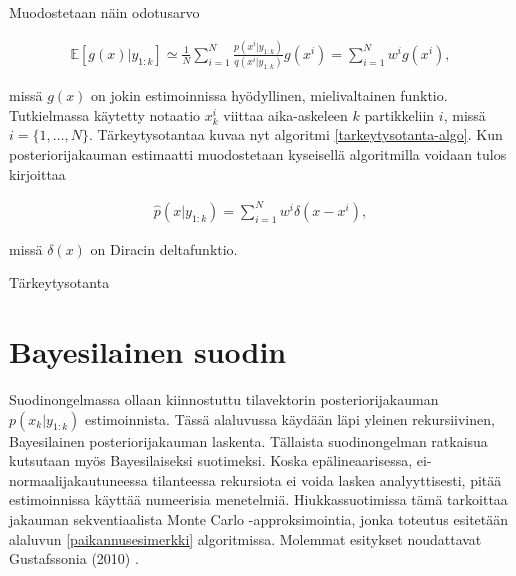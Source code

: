 \documentclass[
  12pt,
  a4paper, twoside]{book}
\begin{document}
Muodostetaan näin odotusarvo

\begin{align}
\mathbb{E}[g(x)|y_{1:k}]\simeq\frac{1}{N}\sum_{i=1}^N\frac{p(x^i|y_{1:k})}{q(x^i|y_{1:k})}g(x^i)=\sum_{i=1}^Nw^ig(x^i),
\end{align}

\noindent missä \(g(x)\) on jokin estimoinnissa hyödyllinen, mielivaltainen funktio. Tutkielmassa käytetty notaatio \(x_k^i\) viittaa aika-askeleen \(k\) partikkeliin \(i\), missä \(i=\{1,\ldots,N\}\). Tärkeytysotantaa kuvaa nyt algoritmi \ref{tarkeytysotanta-algo}. Kun posteriorijakauman estimaatti muodostetaan kyseisellä algoritmilla voidaan tulos kirjoittaa

\begin{align}
\hat{p}(x|y_{1:k})=\sum_{i=1}^{N}w^i \delta(x-x^i),
\end{align}

\noindent missä \(\delta(x)\) on Diracin deltafunktio.

\begin{algorithm}[H]
\label{tarkeytysotanta-algo}
\DontPrintSemicolon
{}  
\caption{Tärkeytysotanta}
\end{algorithm}

\section{Bayesilainen suodin} \label{bayesilainen-suodin}

Suodinongelmassa ollaan kiinnostuttu tilavektorin posteriorijakauman \(p(x_k|y_{1:k})\) estimoinnista. Tässä alaluvussa käydään läpi yleinen rekursiivinen, Bayesilainen posteriorijakauman laskenta. Tällaista suodinongelman ratkaisua kutsutaan myös Bayesilaiseksi suotimeksi. Koska epälineaarisessa, ei-normaalijakautuneessa tilanteessa rekursiota ei voida laskea analyyttisesti, pitää estimoinnissa käyttää numeerisia menetelmiä. Hiukkassuotimissa tämä tarkoittaa jakauman sekventiaalista Monte Carlo -approksimointia, jonka toteutus esitetään alaluvun \ref{paikannusesimerkki} algoritmissa. Molemmat esitykset noudattavat Gustafssonia (2010) \citep{gustafsson-2010}.
\end{document}
